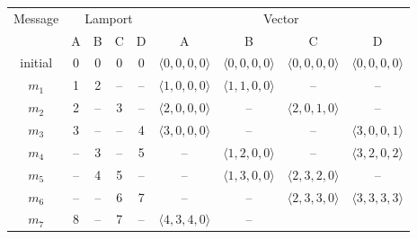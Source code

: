 {    %
    \begin{center}
    \begin{tabular}{|c|cccc|cccc|}
    \hline
    Message & \multicolumn{4}{c|}{Lamport} & \multicolumn{4}{c|}{Vector} \\
            &  A &  B &  C &  D            & A & B & C & D \\
    \hline
    initial &  0 & 0  &  0 &  0            & $\langle 0, 0, 0, 0 \rangle$
                                           & $\langle 0, 0, 0, 0 \rangle$
                                           & $\langle 0, 0, 0, 0 \rangle$
                                           & $\langle 0, 0, 0, 0 \rangle$ \\
    \hline
    $m_1$   &  1 &  2 & -- & --            & $\langle 1, 0, 0, 0 \rangle$
                                           & $\langle 1, 1, 0, 0 \rangle$
                                           & --
                                           & -- \\
    $m_2$   &  2 & -- &  3 & --            & $\langle 2, 0, 0, 0 \rangle$
                                           & --
                                           & $\langle 2, 0, 1, 0 \rangle$
                                           & -- \\
    $m_3$   &  3 & -- & -- &  4            & $\langle 3, 0, 0, 0 \rangle$
                                           & --
                                           & --
                                           & $\langle 3, 0, 0, 1 \rangle$ \\
    $m_4$   & -- &  3 & -- &  5            & --
                                           & $\langle 1, 2, 0, 0 \rangle$
                                           & --
                                           & $\langle 3, 2, 0, 2 \rangle$ \\
    $m_5$   & -- &  4 &  5 & --            & --
                                           & $\langle 1, 3, 0, 0 \rangle$
                                           & $\langle 2, 3, 2, 0 \rangle$
                                           & -- \\
    $m_6$   & -- & -- &  6 &  7            & --
                                           & --
                                           & $\langle 2, 3, 3, 0 \rangle$
                                           & $\langle 3, 3, 3, 3 \rangle$ \\
    $m_7$   &  8 & -- &  7 & --            & $\langle 4, 3, 4, 0 \rangle$
                                           & --

\end{tabular}
\end{center}}
